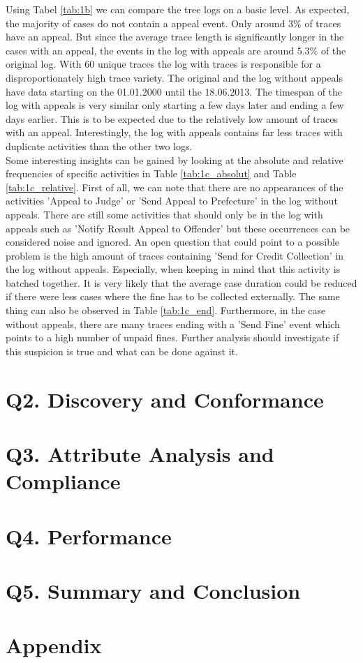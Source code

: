 \documentclass[12pt]{report}
\begin{document}
Using Tabel \ref{tab:1b} we can compare the tree logs on a basic level. As expected, the majority of
cases do not contain a appeal event. Only around $3\%$ of traces have an appeal. But since the average trace length is
significantly longer in the cases with an appeal, the events in the log with appeals are around $5.3\%$ of the original log.
With 60 unique traces the log with traces is responsible for a disproportionately high trace variety. The original and the log
without appeals have data starting on the 01.01.2000 until the 18.06.2013. The timespan of the log with appeals is very similar
only starting a few days later and ending a few days earlier. This is to be expected due to the relatively low amount of traces
with an appeal. Interestingly, the log with appeals contains far less traces with duplicate activities than the other two logs. \\

Some interesting insights can be gained by looking at the absolute and relative frequencies of specific activities in Table \ref{tab:1c_absolut} and Table \ref{tab:1c_relative}.
First of all, we can note that there are no appearances of the activities 'Appeal to Judge' or 'Send Appeal to Prefecture' in the log without appeals.
There are still some activities that should only be in the log with appeals such as 'Notify Result Appeal to Offender' but these occurrences can
be considered noise and ignored. An open question that could point to a possible problem is the high amount of traces containing 'Send for Credit Collection' in the log without appeals. Especially, when keeping in mind that this activity is batched together. It is very likely that the average
case duration could be reduced if there were less cases where the fine has to be collected externally. The same thing can also be observed in Table \ref{tab:1c_end}. Furthermore, in the case without appeals, there are many traces ending with a 'Send Fine' event which points to a high number of unpaid fines. Further analysis should investigate if this suspicion is true and what can be done against it.

\section{Q2. Discovery and Conformance}

\section{Q3. Attribute Analysis and Compliance}

\section{Q4. Performance}

\section{Q5. Summary and Conclusion}

\section*{Appendix}
\end{document}
